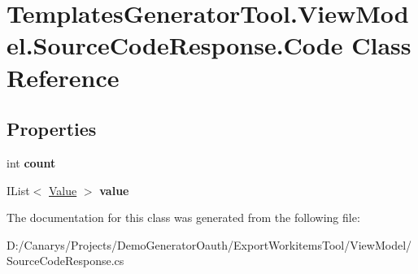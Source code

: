 \hypertarget{class_templates_generator_tool_1_1_view_model_1_1_source_code_response_1_1_code}{}\section{Templates\+Generator\+Tool.\+View\+Model.\+Source\+Code\+Response.\+Code Class Reference}
\label{class_templates_generator_tool_1_1_view_model_1_1_source_code_response_1_1_code}
\subsection*{Properties}
\begin{DoxyCompactItemize}
\item 
\mbox{\label{class_templates_generator_tool_1_1_view_model_1_1_source_code_response_1_1_code_af659c27ae4c78d14ad13674a30a0a3bb}} 
int {\bfseries count}
\item 
\mbox{\label{class_templates_generator_tool_1_1_view_model_1_1_source_code_response_1_1_code_a03a16172f059d9d98f141d304ee85c35}} 
I\+List$<$ \mbox{\hyperlink{class_templates_generator_tool_1_1_view_model_1_1_source_code_response_1_1_value}{Value}} $>$ {\bfseries value}
\end{DoxyCompactItemize}


The documentation for this class was generated from the following file\+:\begin{DoxyCompactItemize}
\item 
D\+:/\+Canarys/\+Projects/\+Demo\+Generator\+Oauth/\+Export\+Workitems\+Tool/\+View\+Model/Source\+Code\+Response.\+cs\end{DoxyCompactItemize}

